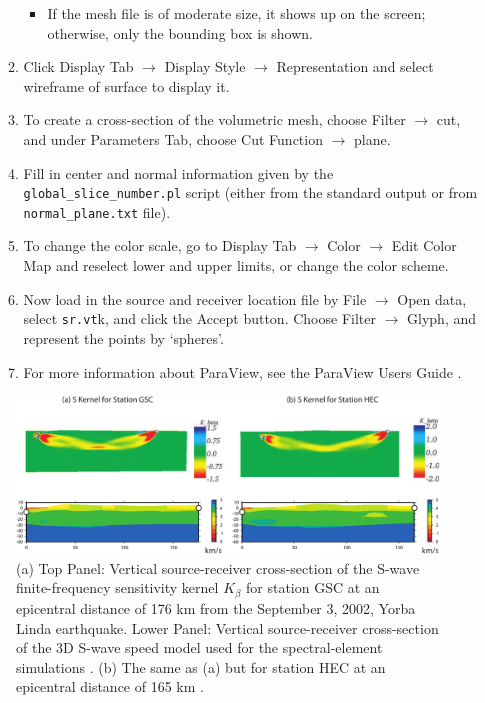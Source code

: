 \begin{enumerate}
\begin{enumerate}
\begin{itemize}
\item If the mesh file is of moderate size, it shows up on the screen; otherwise,
only the bounding box is shown.
\end{itemize}
\item Click \textsf{Display Tab} $\rightarrow$ \textsf{Display Style} $\rightarrow$
\textsf{Representation} and select \textsf{wireframe of surface} to
display it.
\item To create a cross-section of the volumetric mesh, choose \textsf{Filter}
$\rightarrow$ \textsf{cut}, and under \textsf{Parameters Tab}, choose
\textsf{Cut Function} $\rightarrow$ \textsf{plane}.
\item Fill in center and normal information given by the \texttt{global\_slice\_number.pl}
script (either from the standard output or from \texttt{normal\_plane.txt}
file).
\item To change the color scale, go to \textsf{Display Tab} $\rightarrow$
\textsf{Color} $\rightarrow$ \textsf{Edit Color Map} and reselect
lower and upper limits, or change the color scheme.
\item Now load in the source and receiver location file by \textsf{File}
$\rightarrow$ \textsf{Open data}, select \texttt{sr.vt}k, and click
the \textsf{Accept} button. Choose \textsf{Filter} $\rightarrow$
\textsf{Glyph}, and represent the points by `\textsf{spheres}'.
\item For more information about ParaView, see the ParaView Users Guide
.
\end{enumerate}
\end{enumerate}
\begin{figure}[H]
\noindent \begin{centering}
\includegraphics[scale=0.6]{figures/3D-S-Kernel.pdf}
\par\end{centering}

\caption{(a) Top Panel: Vertical source-receiver cross-section of the S-wave
finite-frequency sensitivity kernel $K_{\beta}$ for station GSC at
an epicentral distance of 176 km from the September 3, 2002, Yorba
Linda earthquake. Lower Panel: Vertical source-receiver cross-section
of the 3D S-wave speed model used for the spectral-element simulations
\citep{KoLiTrSuStSh04}. (b) The same as (a) but for station HEC at
an epicentral distance of 165 km \citep{LiTr06}.}


\label{figure:P-wave-speed-finite-frequency}
\end{figure}


